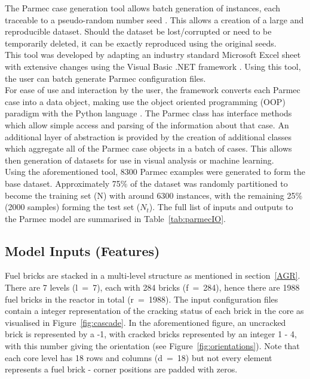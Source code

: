 The Parmec case generation tool allows batch generation of instances, each traceable to a pseudo-random number seed \cite{blum1982simple}. This allows a creation of a large and reproducible dataset. Should the dataset be lost/corrupted or need to be temporarily deleted, it can be exactly reproduced using the original seeds.
\\

\noindent
This tool was developed by adapting an industry standard Microsoft Excel sheet with extensive changes using the Visual Basic .NET framework \cite{grundgeiger2018programming}. Using this tool, the user can batch generate Parmec configuration files. 
\\

\noindent
For ease of use and interaction by the user, the framework converts each Parmec case into a data object, making use the object oriented programming (OOP) paradigm \cite{meyer1997object} with the Python language \cite{deitel2002python}. The Parmec class has interface methods which allow simple access and parsing of the information about that case. An additional layer of abstraction is provided by the creation of additional classes which aggregate all of the Parmec case objects in a batch of cases. This allows then generation of datasets for use in visual analysis or machine learning.
\\

\noindent
Using the aforementioned tool, 8300 Parmec examples were generated to form the base dataset. Approximately 75\% of the dataset was randomly partitioned to become the training set (N) with around 6300 instances, with the remaining 25\% (2000 samples) forming the test set ($N_t$). The full list of inputs and outputs to the Parmec model are summarised in Table~\ref{tab:parmecIO}.


\subsection{Model Inputs (Features)} \label{data:inputs}

Fuel bricks are stacked in a multi-level structure as mentioned in section~\ref{AGR}. There are 7 levels (l~=~7), each with 284 bricks (f~=~284), hence there are 1988 fuel bricks in the reactor in total (r~=~1988). The input configuration files contain a integer representation of the cracking status of each brick in the core as visualised in Figure~\ref{fig:cascade}. In the aforementioned figure, an uncracked brick is represented by a -1, with cracked bricks represented by an integer 1 - 4, with this number giving the orientation (see Figure~\ref{fig:orientations}). Note that each core level has 18 rows and columns (d~=~18) but not every element represents a fuel brick - corner positions are padded with zeros.
\\

